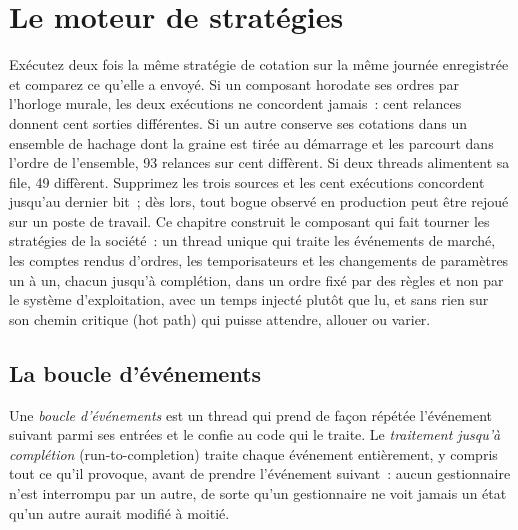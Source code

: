 \chapter{Le moteur de stratégies}\label{ch:ll:the-strategy-engine}

Exécutez deux fois la même stratégie de cotation sur la même journée enregistrée et comparez ce qu'elle a envoyé. Si un composant horodate ses ordres
par l'horloge murale, les deux exécutions ne concordent jamais~: cent relances donnent cent sorties différentes. Si un autre conserve ses cotations
dans un ensemble de hachage dont la graine est tirée au démarrage et les parcourt dans l'ordre de l'ensemble, 93 relances sur cent diffèrent. Si deux
threads alimentent sa file, 49 diffèrent. Supprimez les trois sources et les cent exécutions concordent jusqu'au dernier bit~; dès lors, tout bogue observé en
production peut être rejoué sur un poste de travail. Ce chapitre construit le composant qui fait tourner les stratégies de la société~: un thread unique
qui traite les événements de marché, les comptes rendus d'ordres, les temporisateurs et les changements de paramètres un à un, chacun jusqu'à complétion, dans un ordre
fixé par des règles et non par le système d'exploitation, avec un temps injecté plutôt que lu, et sans rien sur son chemin critique (hot path) qui
puisse attendre, allouer ou varier.

\section{La boucle d'événements}

\begin{definition}\label{def:ll:the-strategy-engine:loop}
Une \emph{boucle d'événements} est un thread qui prend de façon répétée l'événement suivant parmi ses entrées et le confie au code
qui le traite. Le \emph{traitement jusqu'à complétion} (run-to-completion) traite chaque événement entièrement, y compris
tout ce qu'il provoque, avant de prendre l'événement suivant~: aucun gestionnaire n'est interrompu par un autre, de sorte qu'un gestionnaire ne voit jamais un état
qu'un autre aurait modifié à moitié.
\end{definition}

